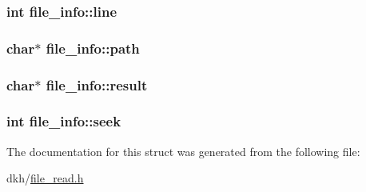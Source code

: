 \hypertarget{structfile__info_ab0c900c50eef067aed0a257b218e5396}{
\subsubsection[{line}]{\setlength{\rightskip}{0pt plus 5cm}int file\+\_\+info\+::line}}\label{structfile__info_ab0c900c50eef067aed0a257b218e5396}
\hypertarget{structfile__info_a031658e6d1a3906f23b26a88e05ce6d0}{
\subsubsection[{path}]{\setlength{\rightskip}{0pt plus 5cm}char$\ast$ file\+\_\+info\+::path}}\label{structfile__info_a031658e6d1a3906f23b26a88e05ce6d0}
\hypertarget{structfile__info_a0b17a1cbdb96ab198326c6073c862fe1}{
\subsubsection[{result}]{\setlength{\rightskip}{0pt plus 5cm}char$\ast$ file\+\_\+info\+::result}}\label{structfile__info_a0b17a1cbdb96ab198326c6073c862fe1}
\hypertarget{structfile__info_a8906d485cfe0e1095b3ed0e35c6e7506}{
\subsubsection[{seek}]{\setlength{\rightskip}{0pt plus 5cm}int file\+\_\+info\+::seek}}\label{structfile__info_a8906d485cfe0e1095b3ed0e35c6e7506}


The documentation for this struct was generated from the following file\+:\begin{DoxyCompactItemize}
\item 
dkh/\hyperlink{file__read_8h}{file\+\_\+read.\+h}\end{DoxyCompactItemize}
